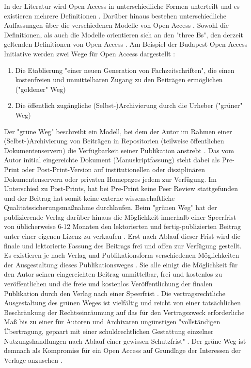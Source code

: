 In der Literatur wird Open Access in unterschiedliche Formen unterteilt und es existieren mehrere Definitionen \cite{CREATe_2014} \cite{albert_2006_open_implications}. Darüber hinaus bestehen unterschiedliche Auffassungen über die verschiedenen Modelle von Open Access \cite{CREATe_2014} \cite{cite:22b} \cite{lewis_2012_inevitability}. Sowohl die Definitionen, als auch die Modelle orientieren sich an den "three Bs", den derzeit geltenden Definitionen von Open Access \cite{Adema_2014_open_access}. Am Beispiel der Budapest Open Access Initiative werden zwei Wege für Open Access dargestellt \cite{albert_2006_open_implications}:
\begin{enumerate}
\item Die Etablierung "einer neuen Generation von Fachzeitschriften", die einen kostenfreien und unmittelbaren Zugang zu den Beiträgen ermöglichen ("goldener" Weg)
\item Die öffentlich zugängliche (Selbst-)Archivierung durch die Urheber ("grüner" Weg)
\end{enumerate}

Der "grüne Weg" beschreibt ein Modell, bei dem der Autor im Rahmen einer (Selbst-)Archivierung von Beiträgen in Repositorien (teilweise öffentlichen Dokumentenservern) die Verfügbarkeit seiner Publikation anstrebt \cite{muller_2010_open} \cite{grand_2012_open}. Das vom Autor initial eingereichte Dokument (Manuskriptfassung) steht dabei als Pre-Print oder Post-Print-Version auf institutionellen oder disziplinären Dokumentenservern \cite{suchen} oder privaten Homepages \cite{suchen} jedem zur Verfügung. Im Unterschied zu Post-Prints, hat bei Pre-Print keine Peer Review stattgefunden \cite{suchen} und der Beitrag hat somit keine externe wissenschaftliche Qualitätssicherungsmaßnahme durchlaufen. Beim "grünen Weg" hat der publizierende Verlag darüber hinaus die Möglichkeit innerhalb einer Speerfrist von üblicherweise 6-12 Monaten \cite{suchen} den lektorierten und fertig-publizierten Beitrag unter einer eigenen Lizenz zu verkaufen \cite{suchen}. Erst nach Ablauf dieser Frist wird die finale und lektorierte Fassung des Beitrags frei und offen zur Verfügung gestellt. Es existieren je nach Verlag und Publikationsform verschiedenen Möglichkeiten der Ausgestaltung dieses Publikationsweges \cite{suchen}. Sie alle einigt die Möglichkeit für den Autor seinen eingereichten Beitrag unmittelbar, frei und kostenlos zu veröffentlichen und die freie und kostenlos Veröffentlichung der finalen Publikation durch den Verlag nach einer Speerfrist \cite{dorschel_2006_open}. Die vertragsrechtliche Ausgestaltung des grünen Weges ist vielfältig und reicht von einer tatsächlichen Beschränkung der Rechtseinräumung auf das für den Vertragszweck erforderliche Maß bis zu einer für Autoren und Archivaren ungünstigen "vollständigen Übertragung, gepaart mit einer schuldrechtlichen Gestattung einzelner Nutzungshandlungen nach Ablauf einer gewissen Schutzfrist" \cite{dorschel_2006_open}. Der grüne Weg ist demnach als Kompromiss für ein Open Access auf Grundlage der Interessen der Verlage anzusehen \cite{Mussell_2013}.

